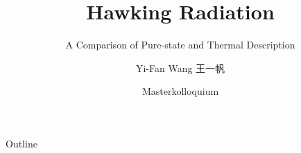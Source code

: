 \documentclass{beamer}
\title%
{Hawking Radiation}
\subtitle{A Comparison of Pure-state and Thermal Description}
\author[Wang] %
{Yi-Fan Wang 王一帆}
\institute[Uni zu Köln] %
{
  Institut für Theoretische Physik \\
  Universität zu Köln}
\date%
{Masterkolloquium}
\begin{document}
\begin{frame}
  \titlepage
\end{frame}

\begin{frame}{Outline}
  \tableofcontents
\end{frame}









\end{document}
